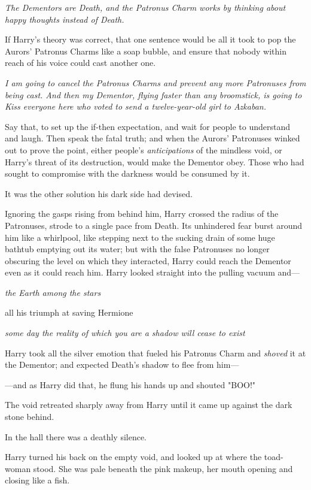 \emph{The Dementors are Death, and the Patronus Charm works by thinking about
happy thoughts instead of Death.}

If Harry's theory was correct, that one sentence would be all it took to pop
the Aurors' Patronus Charms like a soap bubble, and ensure that nobody within
reach of his voice could cast another one.

\emph{I am going to cancel the Patronus Charms and prevent any more Patronuses
from being cast. And then my Dementor, flying faster than any broomstick, is
going to Kiss everyone here who voted to send a twelve-year-old girl to
Azkaban.}

Say that, to set up the if-then expectation, and wait for people to understand
and laugh. Then speak the fatal truth; and when the Aurors' Patronuses winked
out to prove the point, either people's \emph{anticipations} of the mindless
void, or Harry's threat of its destruction, would make the Dementor obey. Those
who had sought to compromise with the darkness would be consumed by it.

It was the other solution his dark side had devised.

Ignoring the gasps rising from behind him, Harry crossed the radius of the
Patronuses, strode to a single pace from Death. Its unhindered fear burst
around him like a whirlpool, like stepping next to the sucking drain of some
huge bathtub emptying out its water; but with the false Patronuses no longer
obscuring the level on which they interacted, Harry could reach the Dementor
even as it could reach him. Harry looked straight into the pulling vacuum and---

\emph{the Earth among the stars}

all his triumph at saving Hermione

\emph{some day the reality of which you are a shadow will cease to exist}

Harry took all the silver emotion that fueled his Patronus Charm and
\emph{shoved} it at the Dementor; and expected Death's shadow to flee from
him---

---and as Harry did that, he flung his hands up and shouted "BOO!"

The void retreated sharply away from Harry until it came up against the dark
stone behind.

In the hall there was a deathly silence.

Harry turned his back on the empty void, and looked up at where the toad-woman
stood. She was pale beneath the pink makeup, her mouth opening and closing like
a fish.

